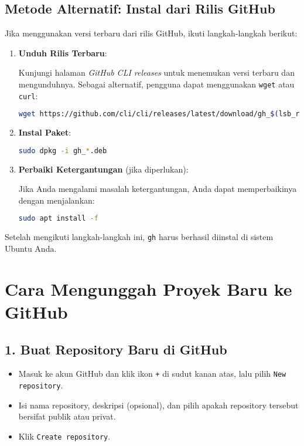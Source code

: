 \subsection{Metode Alternatif: Instal dari Rilis GitHub}
Jika menggunakan versi terbaru dari rilis GitHub, ikuti langkah-langkah berikut:

\begin{enumerate}
	\item \textbf{Unduh Rilis Terbaru}:
	
	Kunjungi halaman \textit{GitHub CLI releases} untuk menemukan versi terbaru dan mengunduhnya. Sebagai alternatif, pengguna dapat menggunakan \texttt{wget} atau \texttt{curl}:
	
	\begin{lstlisting}[language=bash]
		wget https://github.com/cli/cli/releases/latest/download/gh_$(lsb_release -cs)_amd64.deb
	\end{lstlisting}
	
	\item \textbf{Instal Paket}:
	
	\begin{lstlisting}[language=bash]
		sudo dpkg -i gh_*.deb
	\end{lstlisting}
	
	\item \textbf{Perbaiki Ketergantungan} (jika diperlukan):
	
	Jika Anda mengalami masalah ketergantungan, Anda dapat memperbaikinya dengan menjalankan:
	
	\begin{lstlisting}[language=bash]
		sudo apt install -f
	\end{lstlisting}
\end{enumerate}

Setelah mengikuti langkah-langkah ini, \texttt{gh} harus berhasil diinstal di sistem Ubuntu Anda.

\section{Cara Mengunggah Proyek Baru ke GitHub}

\subsection{1. Buat Repository Baru di GitHub}
\begin{itemize}
	\item Masuk ke akun GitHub dan klik ikon \texttt{+} di sudut kanan atas, lalu pilih \texttt{New repository}.
	\item Isi nama repository, deskripsi (opsional), dan pilih apakah repository tersebut bersifat publik atau privat.
	\item Klik \texttt{Create repository}.
\end{itemize}


